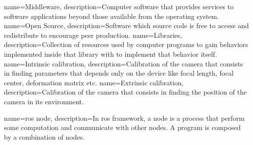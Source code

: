 {
        name=Middleware,
        description={Computer software that provides services to software applications beyond those available from the operating system.}
}
{
        name=Open Source,
        description={Software which source code is free to access and redistribute to encourage peer production.}
}
{
        name=Libraries,
        description={Collection of resources used by computer programs to gain behaviors implemented inside that library with to implement that behavior itself.}
}
{
        name=Intrinsic calibration,
        description={Calibration of the camera that consists in finding parameters that depends only on the device like focal length, focal center, deformation matrix etc.}
}
{
    name=Extrinsic calibration,
    description={Calibration of the camera that consists in finding the position of the camera in its environment.}
}

{
    name=\acrshort{ros} node,
    description={In \acrshort{ros} framework, a node is a process that perform some computation and communicate with other nodes. A program is composed by a combination of nodes.}
}